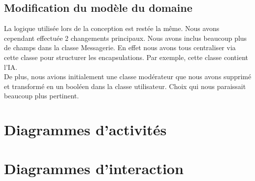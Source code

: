 \documentclass[11pt,dvipsnames,svgnames]{report}
\begin{document}
\subsection{Modification du modèle du domaine}
La logique utilisée lors de la conception est restée la même. Nous avons cependant effectuée 2 changements principaux. Nous avons inclus beaucoup plus de champs dans la classe Messagerie. En effet nous avons tous centraliser via cette classe pour structurer les encapsulations. Par exemple, cette classe contient l'IA. \\
De plus, nous avions initialement une classe modérateur que nous avons supprimé et transformé en un booléen dans la classe utilisateur. Choix qui nous paraissait beaucoup plus pertinent.

\section{Diagrammes d'activités}
%
%
%


\section{Diagrammes d’interaction}

%
%
\end{document}

